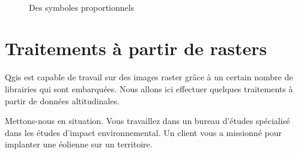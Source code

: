 \documentclass[a4paper, 11pt]{article}
\begin{document}
  \begin{figure}
  \centering
  \\
    \caption{Des symboles proportionnels}\label{fig:analyseThematique}
  \end{figure}

\section{Traitements à partir de rasters}
  Qgis est capable de travail sur des images raster grâce à un certain nombre de librairies qui sont embarquées. Nous allons ici effectuer quelques traitements à partir de données altitudinales.

  Mettons-nous en situation. Vous travaillez dans un bureau d'études spécialisé dans les études d'impact environnemental. Un client vous a missionné pour implanter une éolienne sur un territoire.
\end{document}
